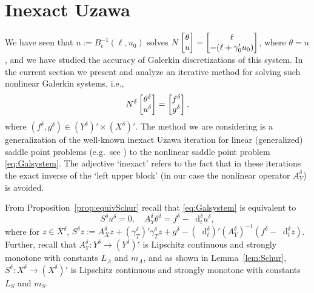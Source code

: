 \documentclass{amsart}
\numberwithin{equation}{section}
\newcommand{\NN}{N}
\newcommand{\1}{\mathbb 1}
\newcommand*\diff{\mathop{}\!\mathrm{d}}
\begin{document}
\section{Inexact Uzawa} \label{sec:7}
We have seen that $u:=B_e^{-1}(\ell,u_0)$ solves $\NN
\left[\begin{array}{@{}c@{}} \theta \\ u \end{array}\right]=
\left[\begin{array}{@{}c@{}} \ell \\ -(\ell+\gamma_0' u_0) \end{array}\right]$, where $\theta=u$, and we have studied the accuracy of Galerkin discretizations of this system. In the current section we present and analyze an iterative method for solving such nonlinear Galerkin systems, i.e.,
$$
\NN^\delta \left[\begin{array}{@{}c@{}} \theta^\delta \\ u^\delta \end{array}\right]=\left[\begin{array}{@{}c@{}} f^\delta \\ g^\delta \end{array}\right],
$$
where $(f^\delta,g^\delta) \in (Y^\delta)' \times (X^\delta)'$.
The method we are considering is a generalization of the well-known inexact Uzawa iteration for linear (generalized) saddle point problems (e.g.~see \cite{34.67,322,234.7}) to the nonlinear saddle point problem \eqref{eq:Galsystem}. The adjective `inexact' refers to the fact that in these iterations the exact inverse of the `left upper block' (in our case the nonlinear operator $A_Y^\delta$)
is avoided.

From Proposition~\ref{prop:equivSchur} recall that \eqref{eq:Galsystem} is equivalent to 
$$
S^\delta u^\delta=0,\quad A_Y^\delta \theta^\delta =f^\delta-\diff_t^\delta u^\delta,
$$
where for $z \in X^\delta$, $S^\delta z  :=A_X^\delta z+(\gamma_T^\delta)'\gamma_T^\delta z+g^\delta-(\diff_t^\delta)' (A_Y^\delta)^{-1}(f^\delta-\diff_t^\delta z)$. Further, recall that $A_Y^\delta \colon Y^\delta \rightarrow (Y^\delta)'$ is Lipschitz continuous and strongly monotone with constants $L_A$ and $m_A$, and as shown in Lemma~\ref{lem:Schur},
$S^\delta\colon X^\delta \rightarrow (X^\delta)'$ is Lipschitz continuous and strongly monotone with constants $L_S$ and $m_S$.
\end{document}

